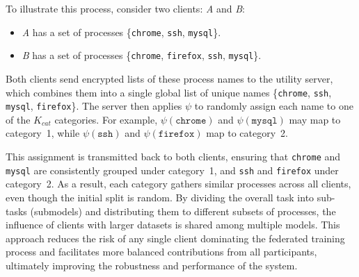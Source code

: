 
To illustrate this process, consider two clients: \emph{A} and \emph{B}:
\begin{itemize}[itemsep=0.1em, parsep=0em, topsep=0em, leftmargin=*]
    \item \emph{A} has a set of processes \{\texttt{chrome}, \texttt{ssh}, \texttt{mysql}\}.
    \item \emph{B} has a set of processes \{\texttt{chrome}, \texttt{firefox}, \texttt{ssh}, \texttt{mysql}\}.
\end{itemize}
Both clients send encrypted lists of these process names to the utility server, which combines them into a single global list of unique names \{\texttt{chrome}, \texttt{ssh}, \texttt{mysql}, \texttt{firefox}\}. The server then applies \( \psi \) to randomly assign each name to one of the \( K_{cat} \) categories. For example, \( \psi(\texttt{chrome}) \) and \( \psi(\texttt{mysql}) \) may map to category~1, while \( \psi(\texttt{ssh}) \) and \( \psi(\texttt{firefox}) \) map to category~2.

This assignment is transmitted back to both clients, ensuring that \texttt{chrome} and \texttt{mysql} are consistently grouped under category~1, and \texttt{ssh} and \texttt{firefox} under category~2. As a result, each category gathers similar processes across all clients, even though the initial split is random. By dividing the overall task into sub-tasks (submodels) and distributing them to different subsets of processes, the influence of clients with larger datasets is shared among multiple models. This approach reduces the risk of any single client dominating the federated training process and facilitates more balanced contributions from all participants, ultimately improving the robustness and performance of the system.

